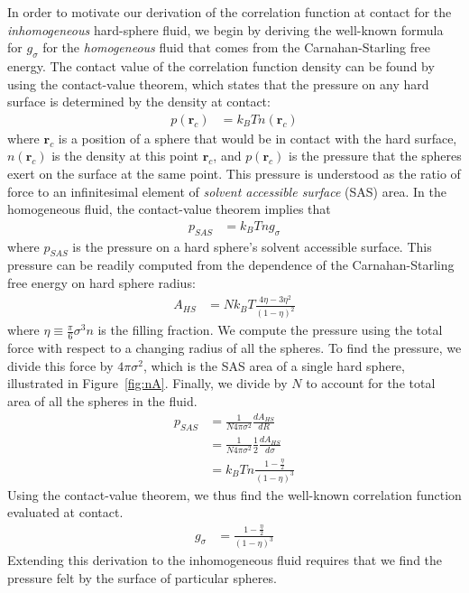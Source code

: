 \documentclass[letterpaper,twocolumn,amsmath,amssymb,pre]{revtex4-1}
\newcommand{\rr}{\textbf{r}}
\begin{document}
In order to motivate our derivation of the correlation function at
contact for the \emph{inhomogeneous} hard-sphere fluid, we begin by
deriving the well-known formula for $g_\sigma$ for the
\emph{homogeneous} fluid that comes from the Carnahan-Starling free
energy.  The contact value of the correlation function density can be
found by using the contact-value theorem, which states that the
pressure on any hard surface is determined by the density at contact:
\begin{align}
  p(\rr_c) &= k_BT n(\rr_c)
\end{align}
where $\rr_c$ is a position of a sphere that would be in contact with
the hard surface, $n(\rr_c)$ is the density at this point $\rr_c$, and $p(\rr_c)$ is the pressure that the spheres
exert on the surface at the same point.  This pressure is
understood as the ratio of force to an infinitesimal element of
\emph{solvent accessible surface} (SAS) area.
%
In the homogeneous fluid, the contact-value theorem implies that
\begin{align}
  p_{\textit{SAS}} &= k_BT n g_\sigma
\end{align}
where $p_{SAS}$ is the pressure on a hard sphere's solvent accessible surface.
This pressure can be
readily computed from the dependence of the Carnahan-Starling free
energy on hard sphere radius:
\begin{align}
  A_{HS} &= Nk_BT \frac{4\eta - 3\eta^2}{(1-\eta)^2}
\end{align}
where $\eta \equiv \frac{\pi}{6} \sigma^3 n$ is the filling fraction.
We compute the pressure using the total force with
respect to a changing radius of all the spheres.
To find the pressure, we divide this force by $4\pi \sigma^2$, which
is the SAS area of a single hard sphere, illustrated in Figure~\ref{fig:nA}.
Finally, we divide by $N$ to account for the total area of all the
spheres in the fluid.
\begin{align}
  p_{\textit{SAS}} &= \frac{1}{N 4\pi \sigma^2} \frac{dA_{HS}}{dR} \\
  &= \frac{1}{N 4\pi \sigma^2} \frac12 \frac{dA_{HS}}{d\sigma} \\
  &= k_BT n \frac{1 - \frac{\eta}2}{(1-\eta)^3}
\end{align}
Using the contact-value theorem, we thus find the well-known
correlation function evaluated at contact.
\begin{align}
  g_\sigma &= \frac{1 - \frac{\eta}2}{(1-\eta)^3} \label{eq:cs-g}
\end{align}
Extending this derivation to the inhomogeneous fluid requires that we
find the pressure felt by the surface of particular spheres.
\end{document}
